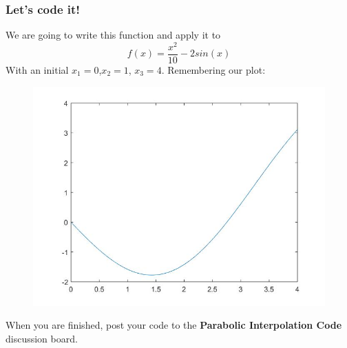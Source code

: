 \documentclass{if-beamer}
\begin{document}
\begin{frame}
	\frametitle{Let's code it!}
	We are going to write this function and apply it to
	$$f(x) = \frac{x^2}{10}-2sin(x)$$
	With an initial $x_1 =0$,$x_2 = 1$, $x_3 =4$. Remembering our plot:
	\begin{figure}
		\centering
		\includegraphics[width=.6\textwidth]{figures/plot}
	\end{figure}
When you are finished, post your code to the \textbf{Parabolic Interpolation Code} discussion board.	
\end{frame}
\end{document}
